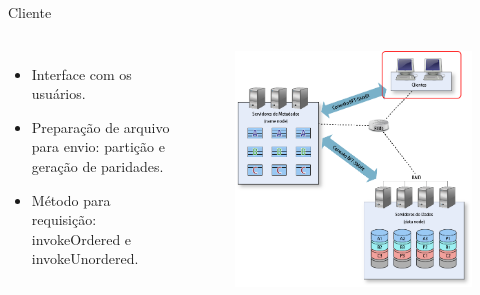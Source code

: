 \begin{frame}{Cliente}
	\begin{columns}
		\begin{itemize}
			\item Interface com os usuários.
			\item Preparação de arquivo para envio: partição e geração de paridades.
			\item Método para requisição: invokeOrdered e invokeUnordered.
		\end{itemize}
		
		\begin{figure}
			\includegraphics[width=\textwidth]{imagens/visao_geral3}
		\end{figure}
	\end{columns}
	
\end{frame}


